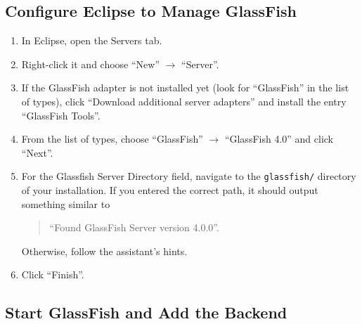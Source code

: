 
\subsection{Configure Eclipse to Manage GlassFish}

\begin{enumerate}
\item In Eclipse, open the Servers tab.
\item Right-click it and choose \enquote{New} $\rightarrow$ \enquote{Server}.
\item If the GlassFish adapter is not installed yet (look for \enquote{GlassFish} in the list of types), click \enquote{Download additional server adapters} and install the entry \enquote{GlassFish Tools}.
\item From the list of types, choose \enquote{GlassFish} $\rightarrow$ \enquote{GlassFish 4.0} and click \enquote{Next}.
\item For the Glassfish Server Directory field, navigate to the \texttt{glassfish/} directory of your installation. If you entered the correct path, it should output something similar to
	\begin{quotation}
	\enquote{Found GlassFish Server version 4.0.0}.
	\end{quotation}
	Otherwise, follow the assistant's hints.
\item Click \enquote{Finish}.

\end{enumerate}

\subsection{Start GlassFish and Add the Backend}

